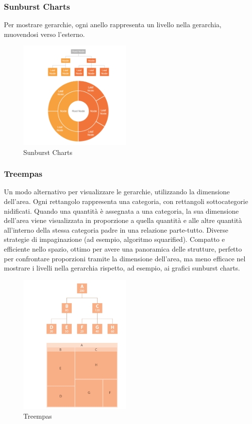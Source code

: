 \subsubsection{Sunburst Charts}
Per mostrare gerarchie, ogni anello rappresenta un livello nella gerarchia,
 muovendosi verso l'esterno.
\begin{figure}[H]
    \centering
    \includegraphics[width=0.5\textwidth]{images/SunBurst.png} %
    \caption{Sunburst Charts}
    \label{fig:immagine}
\end{figure}
\subsubsection{Treempas}
Un modo alternativo per visualizzare le gerarchie, utilizzando la dimensione dell'area.
Ogni rettangolo rappresenta una categoria, con rettangoli sottocategorie nidificati.
Quando una quantità è assegnata a una categoria, la sua dimensione dell'area viene visualizzata in proporzione a quella quantità e alle altre quantità all'interno della stessa categoria padre in una relazione parte-tutto.
Diverse strategie di impaginazione (ad esempio, algoritmo squarified).
Compatto e efficiente nello spazio, ottimo per avere una panoramica delle strutture, perfetto per confrontare proporzioni tramite la dimensione dell'area, ma meno efficace nel mostrare i livelli nella gerarchia rispetto, ad esempio, ai grafici sunburst charts.
\begin{figure}[H]
    \centering
    \includegraphics[width=0.5\textwidth]{images/TreeMpas.png} %
    \caption{Treempas}
    \label{fig:immagine}
\end{figure}